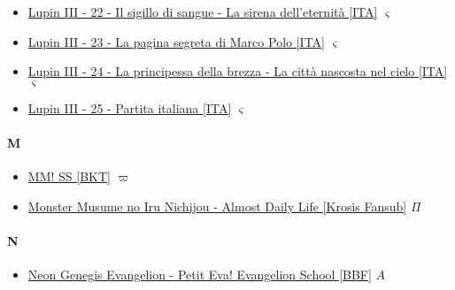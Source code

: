 \begin{itemize}
				\item  \href{https://mega.nz/#!EzZG1K5S!FyXicVXAZAmX5mNsk38epmEt7fxtALt2xZVs__KbKEc} {Lupin III - 22 - Il sigillo di sangue - La sirena dell'eternità [ITA]} $\varsigma$   \\ 
				\item  \href{https://mega.nz/#!U2h2mSoC!fr30VmH2SKY4G7UvQGCbn9W11JOnAjR8rF3gKEjO168} {Lupin III - 23 - La pagina segreta di Marco Polo [ITA]} $\varsigma$   \\ 
				\item  \href{https://mega.nz/#!8yx02Y4Y!XnGTXH9N3flWnRS9uYrHDDJMvhsRUuD5v8JRUGMKyKs} {Lupin III - 24 - La principessa della brezza - La città nascosta nel cielo [ITA]} $\varsigma$   \\ 
				\item  \href{https://mega.nz/#!Iq5mUKgI!oEZyQ0RHs0TJO7jlaBf2lIogGPH0wRkeG8TFF3Jgz3A} {Lupin III - 25 - Partita italiana [ITA]} $\varsigma$   \\ 
			
		\end{itemize}
	
		\paragraph{M} \hypertarget{SPM}{}
			\begin{itemize}
			
				\item  \href{https://mega.nz/#F!CJEjWbYB!-NjAwVnts90GDefI_dOkXw} {MM! SS [BKT]} $\varpi$   \\ 
				\item  \href{https://mega.nz/#!gCpxmb7C!RhM8Oe8Fof-cdp-I_JrLz-EFvzuYjXa9Nkc7YRK3-Wg} {Monster Musume no Iru Nichijou - Almost Daily Life [Krosis Fansub]} $\Pi$   \\ 
		
			\end{itemize}	
		
		\paragraph{N} \hypertarget{SPN}{}
			\begin{itemize}
				
				\item  \href{https://mega.nz/#F!WwAEhbIA!-PYJVWJYcpoiYfJ8Rvvgnw} {Neon Genegis Evangelion - Petit Eva! Evangelion School [BBF]} $A$   \\ 
			
			\end{itemize}
		
